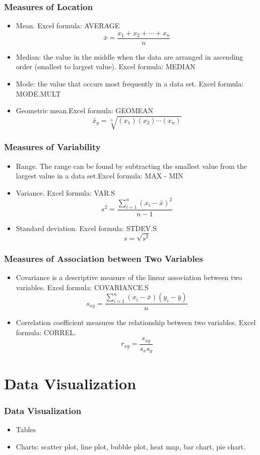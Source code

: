 \documentclass[11pt]{beamer}
\begin{document}
\begin{frame}
\frametitle{Measures of Location}
\begin{itemize}
    \item Mean. Excel formula: AVERAGE
    \[\bar{x} = \frac{x_1+x_2+\cdots+x_n}{n}\]
    \item Median: the value in the middle when the data are arranged in ascending order (smallest to largest value). Excel formula: MEDIAN
    \item Mode: the value that occurs most frequently in a data set. Excel formula: MODE.MULT
    \item Geometric mean.Excel formula: GEOMEAN
    $$\bar{x}_g=\sqrt[n]{(x_1)(x_2)\cdots(x_n)}$$
\end{itemize}
\end{frame}

\begin{frame}
\frametitle{Measures of Variability}
\begin{itemize}
    \item Range. The range can be found by subtracting the smallest value from the largest value in a data set.Excel formula: MAX - MIN
    \item Variance. Excel formula: VAR.S
    $$s^2=\frac{\sum_{i=1}^{n}(x_i-\bar{x})^2}{n-1}$$
    \item Standard deviation. Excel formula: STDEV.S
    $$s=\sqrt{s^2}$$
\end{itemize}
\end{frame}

\begin{frame}
\frametitle{Measures of Association between Two Variables}
\begin{itemize}
    \item Covariance is a descriptive measure of the linear association between two variables. Excel formula: COVARIANCE.S
    $$s_{xy}=\frac{\sum_{i=1}^{n}(x_i-\bar{x})(y_i-\bar{y})}{n}$$
    \item Correlation coefficient measures the relationship between two variables. Excel formula: CORREL.
    $$r_{xy}=\frac{s_{xy}}{s_xs_y}$$
\end{itemize}
\end{frame}

\section{Data Visualization}

\begin{frame}
\frametitle{Data Visualization}
\begin{itemize}
    \item Tables
    \item Charts: scatter plot, line plot, bubble plot, heat map, bar chart, pie chart.
\end{itemize}
\end{frame}
\end{document}
